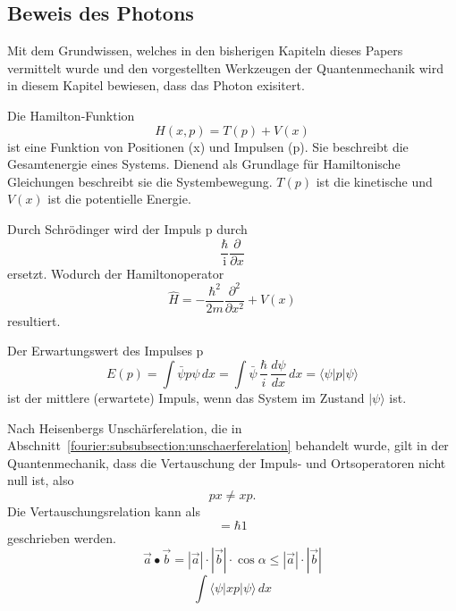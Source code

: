 
\subsection{Beweis des Photons\label{fourier:subsection:beweisPhoton}}
Mit dem Grundwissen, welches in den bisherigen Kapiteln dieses Papers vermittelt wurde und den vorgestellten Werkzeugen der Quantenmechanik wird in diesem Kapitel bewiesen, dass das Photon exisitert.

Die Hamilton-Funktion
\begin{equation}
	H(x,p) = T(p) + V(x)
\end{equation}
ist eine Funktion von Positionen (x) und Impulsen (p).
Sie beschreibt die Gesamtenergie eines Systems.
Dienend als Grundlage für Hamiltonische Gleichungen beschreibt sie die Systembewegung.
$T(p)$ ist die kinetische und $V(x)$ ist die potentielle Energie.

Durch Schrödinger wird der Impuls p durch
\begin{equation}
	\frac{\hbar}{\mathrm{i}} \frac{\partial}{\partial x}
\end{equation}
ersetzt.
Wodurch der Hamiltonoperator
\begin{equation}
	\hat{H} = -\frac{\hbar^2}{2m}\frac{\partial^2}{\partial x^2} + V(x)
\end{equation}	
resultiert.

Der Erwartungswert des Impulses p
\begin{equation}
	E(p) = \int \bar{\psi}p\psi \, dx
	= \int \bar{\psi} \, \frac{\hbar}{i} \, \frac{d\psi}{dx} \, dx
	= \langle \psi | p | \psi \rangle
\end{equation}
ist der mittlere (erwartete) Impuls, wenn das System im Zustand $| \psi \rangle$ ist.

Nach Heisenbergs Unschärferelation, die in Abschnitt~\ref{fourier:subsubsection:unschaerferelation} behandelt wurde, gilt in der Quantenmechanik, dass die Vertauschung der Impuls- und Ortsoperatoren nicht null ist, also
\begin{equation}
	px \neq xp.
\end{equation}
Die Vertauschungsrelation kann als
\begin{equation}
	[x, p] = \hbar 1 %
\end{equation}
geschrieben werden.
\begin{equation}
	\vec{a}\bullet\vec{b} = |\vec{a}| \cdot |\vec{b}| \cdot \cos{\alpha} \leq |\vec{a}| \cdot |\vec{b}|
\end{equation}
\begin{equation}
	\int \langle \psi |xp|\psi \rangle\,dx	%
\end{equation}


